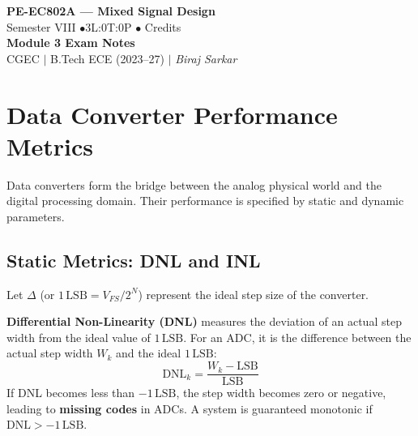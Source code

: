 \documentclass[12pt,a4paper]{article}
\begin{document}

\begin{center}
  {\LARGE\bfseries\color{myred} PE-EC802A --- Mixed Signal Design}\\[5pt]
  {\normalsize\color{mydark} Semester VIII \quad$\bullet$\quad 3L:0T:0P \quad$\bullet$ Credits}\\[3pt]
  {\normalsize\color{myteal}\textbf{Module 3 Exam Notes}}\\[3pt]
  {\small\color{mydark} CGEC \;$|$\; B.Tech ECE (2023--27) \;$|$\; \textit{Biraj Sarkar}}
\end{center}
\vspace{2pt}
\noindent{\color{myred}\rule{\linewidth}{1.5pt}}
\vspace{2pt}

\hypersetup{linkcolor=mydark}
\tableofcontents
\hypersetup{linkcolor=myteal}
\newpage

\section{Data Converter Performance Metrics}

Data converters form the bridge between the analog physical world and the digital processing domain. Their performance is specified by static and dynamic parameters.

\subsection{Static Metrics: DNL and INL}
Let $\Delta$ (or $1\,\text{LSB} = V_{FS}/2^N$) represent the ideal step size of the converter.

\begin{tcolorbox}[defbox, title={\textbf{Differential Non-Linearity (DNL)}}]
\textbf{Differential Non-Linearity (DNL)} measures the deviation of an actual step width from the ideal value of $1\,\text{LSB}$. For an ADC, it is the difference between the actual step width $W_k$ and the ideal $1\,\text{LSB}$:
\[
\text{DNL}_k = \frac{W_k - \text{LSB}}{\text{LSB}}
\]
If DNL becomes less than $-1\,\text{LSB}$, the step width becomes zero or negative, leading to \textbf{missing codes} in ADCs. A system is guaranteed monotonic if $\text{DNL} > -1\,\text{LSB}$.
\end{tcolorbox}
\end{document}
